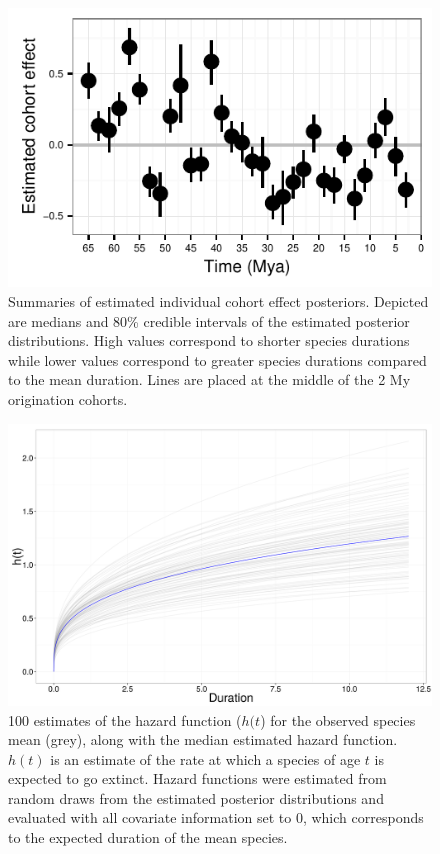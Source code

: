 \documentclass[12pt,letterpaper]{article}
\begin{document}
\begin{figure}[ht]
  \centering
  \includegraphics[height = 0.5\textheight, width = \textwidth, keepaspectratio = true]{figure/cohort_est}
  \caption{Summaries of estimated individual cohort effect posteriors. Depicted are medians and 80\% credible intervals of the estimated posterior distributions. High values correspond to shorter species durations while lower values correspond to greater species durations compared to the mean duration. Lines are placed at the middle of the 2 My origination cohorts.}
  \label{fig:eff_cohort}
\end{figure}

\begin{figure}[ht]
  \centering
  \includegraphics[height = 0.5\textheight, width = \textwidth, keepaspectratio = true]{figure/haz_est}
  \caption{100 estimates of the hazard function (\(h(t\)) for the observed species mean (grey), along with the median estimated hazard function. \(h(t)\) is an estimate of the rate at which a species of age \(t\) is expected to go extinct. Hazard functions were estimated from random draws from the estimated posterior distributions and evaluated with all covariate information set to 0, which corresponds to the expected duration of the mean species.}
  \label{fig:haz}
\end{figure}
\end{document}

